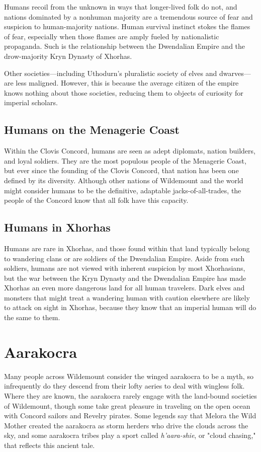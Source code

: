 \documentclass[10pt,a4paper,twoside,bg=print,twocolumn,openany,nodeprecatedcode]{dndbook}
\begin{document}
Humans recoil from the unknown in ways that longer-lived folk do not, and nations dominated by a nonhuman majority are a tremendous source of fear and suspicion to human-majority nations. Human survival instinct stokes the flames of fear, especially when those flames are amply fueled by nationalistic propaganda. Such is the relationship between the Dwendalian Empire and the drow-majority Kryn Dynasty of Xhorhas.

Other societies—including Uthodurn's pluralistic society of elves and dwarves—are less maligned. However, this is because the average citizen of the empire knows nothing about those societies, reducing them to objects of curiosity for imperial scholars.

\subsection{Humans on the Menagerie Coast}
Within the Clovis Concord, humans are seen as adept diplomats, nation builders, and loyal soldiers. They are the most populous people of the Menagerie Coast, but ever since the founding of the Clovis Concord, that nation has been one defined by its diversity. Although other nations of Wildemount and the world might consider humans to be the definitive, adaptable jacks-of-all-trades, the people of the Concord know that all folk have this capacity.

\subsection{Humans in Xhorhas}
Humans are rare in Xhorhas, and those found within that land typically belong to wandering clans or are soldiers of the Dwendalian Empire. Aside from such soldiers, humans are not viewed with inherent suspicion by most Xhorhasians, but the war between the Kryn Dynasty and the Dwendalian Empire has made Xhorhas an even more dangerous land for all human travelers. Dark elves and monsters that might treat a wandering human with caution elsewhere are likely to attack on sight in Xhorhas, because they know that an imperial human will do the same to them.

\section{Aarakocra}
Many people across Wildemount consider the winged aarakocra to be a myth, so infrequently do they descend from their lofty aeries to deal with wingless folk. Where they are known, the aarakocra rarely engage with the land-bound societies of Wildemount, though some take great pleasure in traveling on the open ocean with Concord sailors and Revelry pirates. Some legends say that Melora the Wild Mother created the aarakocra as storm herders who drive the clouds across the sky, and some aarakocra tribes play a sport called \textit{h'aara-shie}, or "cloud chasing," that reflects this ancient tale.
\end{document}
